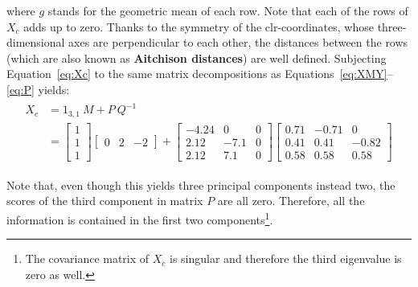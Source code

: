 \noindent where $g$ stands for the geometric mean of each row. Note
that each of the rows of $X_c$ adds up to zero. Thanks to the symmetry
of the clr-coordinates, whose three-dimensional axes are perpendicular
to each other, the distances between the rows (which are also known as
\textbf{Aitchison distances}) are well defined. Subjecting
Equation~\ref{eq:Xc} to the same matrix decompositions as
Equations~\ref{eq:XMY}--\ref{eq:P} yields:
\begin{align}
  \begin{split}
    X_c & = 1_{3,1}~M + P~Q^{-1} \\
    ~ & = 
    \left[
      \begin{array}{c}
        1 \\
        1 \\
        1
      \end{array}
      \right]
   \left[
    \begin{array}{ccc}
        0 & 2 & -2
      \end{array}
      \right]
    + 
     \left[
      \begin{array}{ccc}
        -4.24 &  0   & 0 \\
        2.12  & -7.1 & 0 \\
        2.12  &  7.1 & 0
      \end{array}
      \right]
    \left[
      \begin{array}{ccc}
        0.71 & -0.71 &  0 \\
        0.41 &  0.41 & -0.82 \\
        0.58 &  0.58 &  0.58
      \end{array}
      \right]
    \label{eq:PCAcomp}
  \end{split}
\end{align}

Note that, even though this yields three principal components instead
two, the scores of the third component in matrix $P$ are all zero.
Therefore, all the information is contained in the first two
components\footnote{The covariance matrix of $X_c$ is singular and
therefore the third eigenvalue is zero as well.}.

